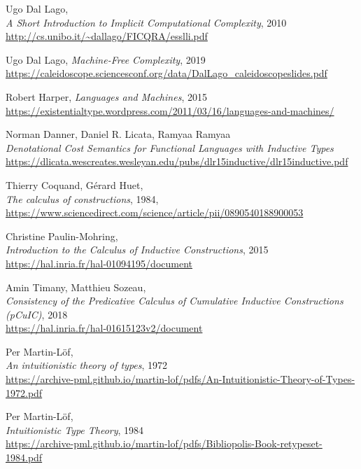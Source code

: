 \documentclass[declaration,mgr,english,shortabstract]{iithesis}
\begin{document}
\begin{thebibliography}{1}
    Ugo Dal Lago, \\
    \textit{A Short Introduction
    to Implicit Computational Complexity}, 2010 \\
    \url{http://cs.unibo.it/~dallago/FICQRA/esslli.pdf}

    Ugo Dal Lago,
    \textit{Machine-Free Complexity},
    2019 \\
    \url{https://caleidoscope.sciencesconf.org/data/DalLago_caleidoscopeslides.pdf}

    Robert Harper, \textit{Languages and Machines}, 2015 \\
    \url{https://existentialtype.wordpress.com/2011/03/16/languages-and-machines/}

    Norman Danner, Daniel R. Licata, Ramyaa Ramyaa \\
    \textit{Denotational Cost Semantics for
    Functional Languages with Inductive Types} \\
    \url{https://dlicata.wescreates.wesleyan.edu/pubs/dlr15inductive/dlr15inductive.pdf}

    Thierry Coquand, Gérard Huet, \\
    \textit{The calculus of constructions}, 1984, \\
    \url{https://www.sciencedirect.com/science/article/pii/0890540188900053}

    Christine Paulin-Mohring, \\
    \textit{Introduction to the Calculus of Inductive Constructions}, 2015 \\
    \url{https://hal.inria.fr/hal-01094195/document}

    Amin Timany, Matthieu Sozeau, \\
    \textit{Consistency of the Predicative Calculus of Cumulative
    Inductive Constructions (pCuIC)}, 2018 \\
    \url{https://hal.inria.fr/hal-01615123v2/document}

    Per Martin-L\"{o}f, \\
    \textit{An intuitionistic theory of types}, 1972 \\
    \url{https://archive-pml.github.io/martin-lof/pdfs/An-Intuitionistic-Theory-of-Types-1972.pdf}

    Per Martin-L\"{o}f, \\
    \textit{Intuitionistic Type Theory}, 1984 \\
    \url{https://archive-pml.github.io/martin-lof/pdfs/Bibliopolis-Book-retypeset-1984.pdf}
    

\end{thebibliography}
\end{document}

